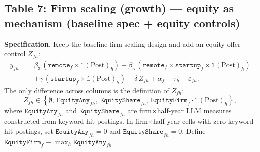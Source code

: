 \documentclass{article}
\newcommand{\cleanedresultsdir}{../../results/cleaned/tex}
\newcommand{\TableInput}[2][\linewidth]{}
\newcommand{\FloatNote}[1]{%
  \begingroup
    \captionsetup{style=noteflush}%
    \caption*{\textit{Notes:}~#1}%
  \endgroup
}
\begin{document}
\subsection*{Table 7: Firm scaling (growth) --- equity as mechanism (baseline spec + equity controls)}
\noindent \textbf{Specification.} Keep the baseline firm scaling design and add an equity-offer control $Z_{fh}$:
\begin{equation*}
\begin{aligned}
  y_{fh} ={}&
  \beta_3\,(\texttt{remote}_f\times \mathds{1}(\text{Post})_h)
  + \beta_5\,(\texttt{remote}_f\times \texttt{startup}_f\times \mathds{1}(\text{Post})_h) \\
  &+ \gamma\,(\texttt{startup}_f\times \mathds{1}(\text{Post})_h)
  + \delta\,Z_{fh}
  + \alpha_f + \tau_h + \varepsilon_{fh}.
\end{aligned}
\end{equation*}
\noindent The only difference across columns is the definition of $Z_{fh}$:
\[
  Z_{fh}\in\left\{\emptyset,\ \texttt{EquityAny}_{fh},\ \texttt{EquityShare}_{fh},\ \texttt{EquityFirm}_f\cdot \mathds{1}(\text{Post})_h\right\},
\]
where $\texttt{EquityAny}_{fh}$ and $\texttt{EquityShare}_{fh}$ are firm$\times$half-year LLM measures constructed from keyword-hit postings. In firm$\times$half-year cells with zero keyword-hit postings, set $\texttt{EquityAny}_{fh}=0$ and $\texttt{EquityShare}_{fh}=0$. Define $\texttt{EquityFirm}_f\equiv\max_h \texttt{EquityAny}_{fh}$.
\begin{table}[H]\centering
  \caption{Firm scaling: equity as mechanism (baseline spec + equity controls)}
  \TableInput{\cleanedresultsdir/llm_equity_mechanism_variants_firm.tex}
  \FloatNote{Rows report the \emph{baseline} remote coefficients $\beta_3$ on $\texttt{Remote}\times\mathds{1}(\text{Post})$ (post remote effect for non-startups) and $\beta_5$ on $\texttt{Remote}\times\mathds{1}(\text{Post})\times\text{Startup}$ (incremental post remote effect for startups). The post remote effect for startups is the sum of the two rows. Columns (1)--(4) differ only by the equity control $Z_{fh}$ (shown via checkmarks in the bottom panel). Because equity enters only as an additive control (not interacted with the remote terms), the meaning of the two reported coefficients is the same across columns; changes across columns reflect how the baseline remote coefficients move when conditioning on equity-offer measures. Panel A reports OLS and Panel B reports IV (instrumenting the remote interaction terms with teleworkability interaction counterparts). Standard errors are clustered by firm and reported in parentheses; *, **, *** denote $p<0.10, 0.05, 0.01$.}
\end{table}
\end{document}
